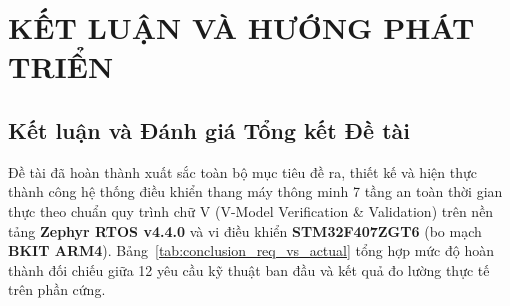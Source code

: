 \clearpage
\section{KẾT LUẬN VÀ HƯỚNG PHÁT TRIỂN}

\subsection{Kết luận và Đánh giá Tổng kết Đề tài}
Đề tài đã hoàn thành xuất sắc toàn bộ mục tiêu đề ra, thiết kế và hiện thực thành công hệ thống điều khiển thang máy thông minh 7 tầng an toàn thời gian thực theo chuẩn quy trình chữ V (V-Model Verification \& Validation) trên nền tảng \textbf{Zephyr RTOS v4.4.0} và vi điều khiển \textbf{STM32F407ZGT6} (bo mạch \textbf{BKIT ARM4}). Bảng~\ref{tab:conclusion_req_vs_actual} tổng hợp mức độ hoàn thành đối chiếu giữa 12 yêu cầu kỹ thuật ban đầu và kết quả đo lường thực tế trên phần cứng.

